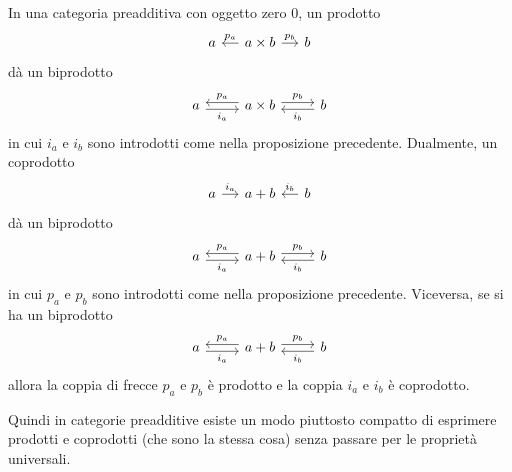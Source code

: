 \begin{proposition}
  In una categoria preadditiva con oggetto zero \(0\), un prodotto
  \[
    \begin{tikzcd}[column sep=small]
      a & a \times b \ar["{p_a}", l, swap] \ar["{p_b}", r] & b
    \end{tikzcd}
  \]
  dà un biprodotto
  \[
    \begin{tikzcd}
      a \ar["{i_a}", r, shift right, swap] & a \times b \ar["{p_a}", l, shift
      right, swap] \ar["{p_b}", r, shift left] & b \ar["{i_b}", l,
      shift left]
    \end{tikzcd}
  \]
  in cui \(i_a\) e \(i_b\) sono introdotti come nella proposizione
  precedente. Dualmente, un coprodotto
  \[
    \begin{tikzcd}[column sep=small]
      a \ar["{i_a}", r] & a + b & b \ar["{i_b}", l, swap]
    \end{tikzcd}
  \]
  dà un biprodotto
  \[
    \begin{tikzcd}
      a \ar["{i_a}", r, shift right, swap] & a+b \ar["{p_a}", l, shift
      right, swap] \ar["{p_b}", r, shift left] & b \ar["{i_b}", l,
      shift left]
    \end{tikzcd}
  \]
  in cui \(p_a\) e \(p_b\) sono introdotti come nella proposizione
  precedente. Viceversa, se si ha un biprodotto
  \[
    \begin{tikzcd}
      a \ar["{i_a}", r, shift right, swap] & a+b \ar["{p_a}", l, shift
      right, swap] \ar["{p_b}", r, shift left] & b \ar["{i_b}", l,
      shift left]
    \end{tikzcd}
  \]
  allora la coppia di frecce \(p_a\) e \(p_b\) è prodotto e la
  coppia \(i_a\) e \(i_b\) è coprodotto.
\end{proposition}

Quindi in categorie preadditive esiste un modo piuttosto compatto di
esprimere prodotti e coprodotti (che sono la stessa cosa) senza
passare per le proprietà universali.

